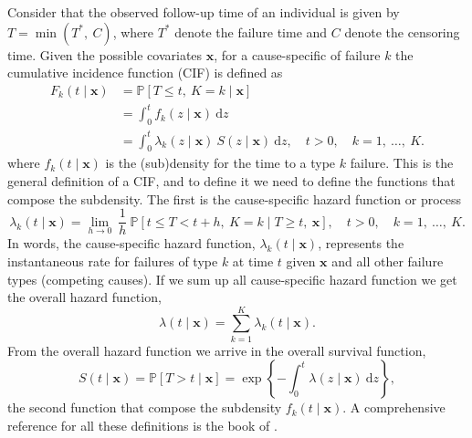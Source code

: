 Consider that the observed follow-up time of an individual is given by
\(T = \min(T^{\ast},~C)\), where \(T^{\ast}\) denote the failure time
and \(C\) denote the censoring time. Given the possible covariates
\(\mathbf{x}\), for a cause-specific of failure \(k\) the cumulative
incidence function (CIF) is defined as
\begin{align*}
  F_{k}(t \mid \mathbf{x})
  &= \mathbb{P}[T \leq t,~K = k \mid \mathbf{x}]\\
  &= \int_{0}^{t} f_{k}(z \mid \mathbf{x})~\text{d}z\\
  &= \int_{0}^{t} \lambda_{k}(z \mid \mathbf{x})~S(z \mid \mathbf{x})
    ~\text{d}z, \quad t > 0, \quad k = 1,~\dots,~K.
\end{align*}
where \(f_{k}(t \mid \mathbf{x})\) is the (sub)density for the time to a
type \(k\) failure. This is the general definition of a CIF, and to
define it we need to define the functions that compose the subdensity.
The first is the cause-specific hazard function or process
\[
  \lambda_{k}(t \mid \mathbf{x}) =
  \lim_{h \rightarrow 0}~\frac{1}{h}~
  \mathbb{P}[t \leq T < t + h,~K = k \mid T \geq t,~\mathbf{x}],
  \quad t > 0, \quad k = 1,~\dots,~K.
\]
In words, the cause-specific hazard function, \(\lambda_{k}(t \mid
\mathbf{x})\), represents the instantaneous rate for failures of type
\(k\) at time \(t\) given \(\mathbf{x}\) and all other failure types
(competing causes). If we sum up all cause-specific hazard function we
get the overall hazard function,
\[
  \lambda(t \mid \mathbf{x}) =
  \sum_{k=1}^{K}\lambda_{k}(t \mid \mathbf{x}).
\]
From the overall hazard function we arrive in the overall survival
function,
\[
  S(t \mid \mathbf{x}) =
  \mathbb{P}[T > t \mid \mathbf{x}] =
  \exp\left\{-\int_{0}^{t} \lambda(z \mid \mathbf{x})~\text{d}z\right\},
\]
the second function that compose the subdensity \(f_{k}(t \mid
\mathbf{x})\). A comprehensive reference for all these definitions is
the book of .

